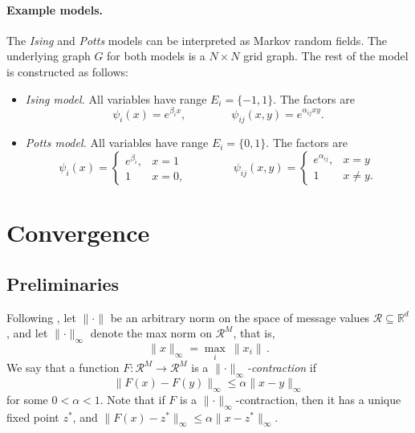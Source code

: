 \documentclass[11pt,a4paper]{article}
\theoremstyle{remark}
\newcommand{\Reals}{\mathbb{R}}
\newcommand{\R}{\mathcal{R}}
\newcommand{\range}{E}
\newcommand{\norm}[1]{\lVert #1 \rVert}
\begin{document}
\paragraph{Example models.} The \emph{Ising} and \emph{Potts} models can be interpreted as Markov random fields. The underlying graph $G$ for both models is a $N \times N$ grid graph. The rest of the model is constructed as follows:
\begin{itemize}
    \item \emph{Ising model.} All variables have range $\range_{i} = \{ -1, 1 \}$. The factors are
    \begin{equation*}
        \psi_i(x) = e^{\beta_{i} x}, \qquad\qquad
        \psi_{ij}(x,y) = e^{\alpha_{ij}xy}.
    \end{equation*}
    \item \emph{Potts model.} All variables have range $\range_{i} = \{ 0, 1 \}$. The factors are
    \begin{equation*}
        \psi_i(x) = \begin{cases} e^{\beta_{i}}, & x = 1 \\1 & x = 0, \end{cases} \qquad\qquad
        \psi_{ij}(x,y) = \begin{cases} e^{\alpha_{ij}}, & x = y \\1 & x \ne y. \end{cases}
    \end{equation*}
\end{itemize}

\section{Convergence}

\subsection{Preliminaries}

Following \cite{elidan2006residual}, let $\norm{\cdot}$ be an arbitrary norm on the space of message values $\R \subseteq \Reals^d$, and let $\norm{\cdot}_\infty$ denote the max norm on $\R^M$, that is, 
\[ \norm{x}_\infty = \max_{i}\  \norm{x_i}\,.\]
We say that a function $F \colon \R^M \to \R^M$ is a \emph{$\norm{\cdot}_\infty$-contraction} if
\[ \norm{ F(x) - F(y)}_{\infty} \le \alpha \norm{x - y}_\infty \]
for some $0 < \alpha < 1$. Note that if $F$ is a $\norm{\cdot}_\infty$-contraction, then it has a unique fixed point $z^*$, and $\norm{ F(x) - z^*}_{\infty} \le \alpha \norm{x - z^*}_\infty$.
\end{document}
